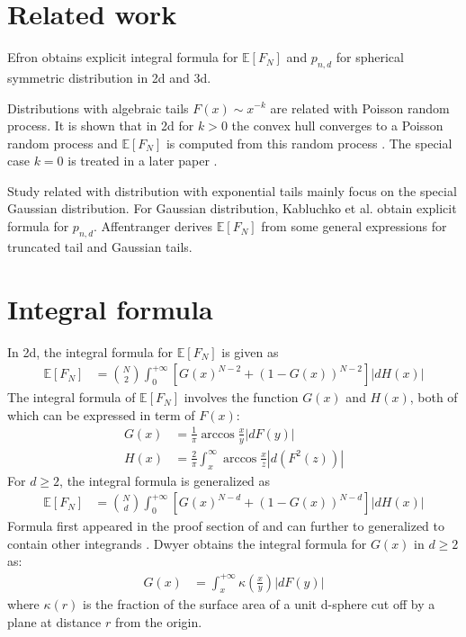 \documentclass{aptpub}
\def\E{\mathbb{E}}
\begin{document}
\section{Related work}

Efron \cite{efron1965convex} obtains explicit integral formula for $\E[F_N]$ and $p_{n,d}$ 
for spherical symmetric distribution in 2d and 3d.

Distributions with algebraic tails $F(x) \sim x^{-k}$ are related with Poisson random process.
It is shown that in 2d for $k>0$ the convex hull converges to a Poisson random process and $\E[F_N]$ is
computed from this random process \cite{davis1987convex}. The special case $k=0$ is treated in a later paper
\cite{aldous1991number}.

Study related with distribution with exponential tails mainly focus on the special Gaussian distribution.
For Gaussian distribution, Kabluchko et al. \cite{kabluchko2020absorption} obtain explicit formula for $p_{n,d}$.
Affentranger \cite{affentranger1991convex} derives $\E[F_N]$ from some general expressions for truncated tail and Gaussian tails.

\section{Integral formula}\label{sec:int_f}
In 2d, the integral formula for $\E[F_N]$ is given as
\begin{align}
     \E[F_N] &= \binom{N}{2} \int_0^{+\infty} 
     \left[G(x)^{N-2} + (1-G(x))^{N-2} \right]|dH(x)| 
     \label{eq:E_F_N_2_d}
\end{align}
The integral formula of $\E[F_N]$ involves the function $G(x)$ and $H(x)$,
both of which can be expressed in term of $F(x)$:
\begin{align}
   G(x) &=\frac{1}{\pi} \arccos\frac{x}{y} |dF(y)| \\
     H(x) &= \frac{2}{\pi} \int_x^{\infty} \arccos \frac{x}{z} |d(F^2(z))|
     \label{eq:H_expression_2_dim}
\end{align}
For $d\geq 2$, the integral formula is generalized as
\begin{align}
     \E[F_N] &= \binom{N}{d} \int_0^{+\infty} 
     \left[G(x)^{N-d} + (1-G(x))^{N-d} \right]|dH(x)| 
     \label{eq:E_F_N_d}
\end{align}
Formula first appeared in the proof section of \cite{raynaud1970enveloppe}
and can further to generalized to contain other integrands \cite{barany2008random}.
Dwyer obtains the integral formula for $G(x)$ in $d\geq 2$ as:
\begin{align}\label{eq:G_d_kappa}
     G(x) & = \int_x^{+\infty} \kappa(\frac{x}{y}) |dF(y)|
\end{align}
where $\kappa(r)$ is the fraction of the surface area of a unit d-sphere
cut off by a plane at distance $r$ from the origin.
\end{document}
